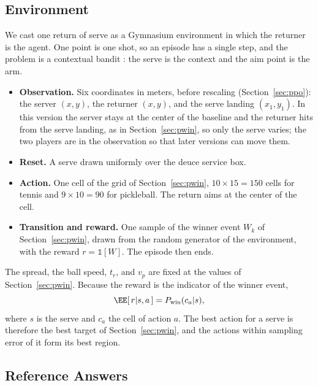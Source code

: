   \subsection{Environment}\label{sec:env}

  We cast one return of serve as a Gymnasium environment
  \cite{towers2024gymnasium} in which the returner is the agent. One point is
  one shot, so an episode has a single step, and the problem is a contextual
  bandit \cite{lattimore2020bandit}: the serve is the context and the aim point
  is the arm.

  \begin{itemize}
    \item \textbf{Observation.} Six coordinates in meters, before rescaling
    (Section~\ref{sec:ppo}): the server $(x, y)$, the returner $(x, y)$, and the
    serve landing $(x_1, y_1)$. In this version the server stays at the center
    of the baseline and the returner hits from the serve landing, as in
    Section~\ref{sec:pwin}, so only the serve varies; the two players are in
    the observation so that later versions can move them.

    \item \textbf{Reset.} A serve drawn uniformly over the deuce service box.

    \item \textbf{Action.} One cell of the grid of Section~\ref{sec:pwin}, $10
    \times 15 = 150$ cells for tennis and $9 \times 10 = 90$ for pickleball. The
    return aims at the center of the cell.

    \item \textbf{Transition and reward.} One sample of the winner event $W_k$
    of Section~\ref{sec:pwin}, drawn from the random generator of the
    environment, with the reward $r = \mathbb{1}[W]$. The episode then ends.
  \end{itemize}

  The spread, the ball speed, $t_r$, and $v_p$ are fixed at the values of
  Section~\ref{sec:pwin}. Because the reward is the indicator of the winner
  event,
  \begin{equation}
  \EE[\, r | s, a \,] = P_{\mathrm{win}}(c_a | s) ,
  \end{equation}
  where $s$ is the serve and $c_a$ the cell of action $a$. The best action for
  a serve is therefore the best target of Section~\ref{sec:pwin}, and the
  actions within sampling error of it form its best region.

  \subsection{Reference Answers}\label{sec:reference}

